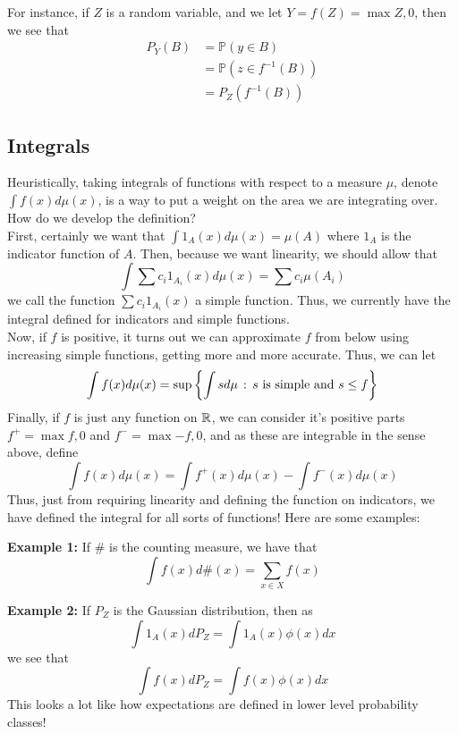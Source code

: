 For instance, if $Z$ is a random variable, and we let $Y = f(Z) = \max{Z, 0}$, then we see that
\begin{align*}
    P_{Y}(B) &= \mathbb{P}(y \in B)\\
    &= \mathbb{P}(z \in f^{-1}(B))\\
    &= P_{Z}(f^{-1}(B))
\end{align*}

\subsection*{Integrals}
Heuristically, taking integrals of functions with respect to a measure $\mu$, denote $\int f(x) d\mu(x)$, is a way to put a weight on the area we are integrating over. How do we develop the definition?\\

First, certainly we want that $\int 1_{A}(x) d\mu(x) = \mu(A)$ where $1_{A}$ is the indicator function of $A$. Then, because we want linearity, we should allow that
\[ \int \sum c_i 1_{A_i}(x) d\mu(x) = \sum c_i \mu(A_i) \]
we call the function $\sum c_i 1_{A_i}(x)$ a simple function. Thus, we currently have the integral defined for indicators and simple functions.\\

Now, if $f$ is positive, it turns out we can approximate $f$ from below using increasing simple functions, getting more and more accurate. Thus, we can let
\[ \int f(x) d\mu(x) = \sup\left\{\int s d\mu \, :\, s \text{ is simple and } s \leq f \right\} \]
Finally, if $f$ is just any function on $\mathbb{R}$, we can consider it's positive parts $f^{+} = \max{f, 0}$ and $f^{-} = \max{-f, 0}$, and as these are integrable in the sense above, define
\[ \int f(x) d\mu(x) = \int f^{+}(x) d\mu(x) - \int f^{-}(x) d\mu(x) \]
Thus, just from requiring linearity and defining the function on indicators, we have defined the integral for all sorts of functions! Here are some examples:

\textbf{Example 1:} If $\#$ is the counting measure, we have that
\[ \int f(x) d\#(x) = \sum_{x \in X} f(x) \]

\textbf{Example 2:} If $P_{Z}$ is the Gaussian distribution, then as
\[ \int 1_{A}(x) dP_{Z} = \int 1_{A}(x) \phi(x) dx \]
we see that
\[ \int f(x) dP_{Z} = \int f(x)\phi(x) dx \]
This looks a lot like how expectations are defined in lower level probability classes!